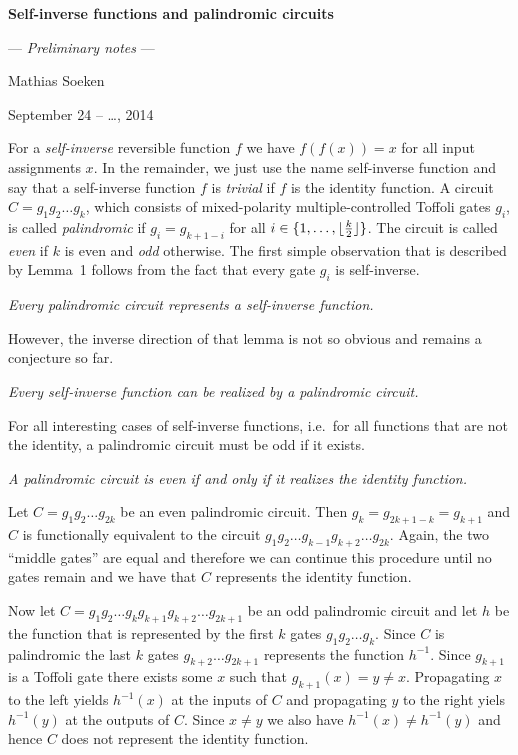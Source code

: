 \magnification\magstephalf
\parskip3pt
\baselineskip14pt

\def\slug{\hbox{\kern1.5pt\vrule width2.5pt height6pt depth1.5pt\kern1.5pt}}
\def\slugonright{\vrule width0pt\nobreak\hfill\slug}

\centerline{\bf Self-inverse functions and palindromic circuits}
\centerline{--- {\it Preliminary notes\/} ---}
\centerline{Mathias Soeken}
\centerline{September 24 -- \dots, 2014}

\bigskip
\bigskip

\enspace For a {\it self-inverse\/} reversible
function $f$ we have $f(f(x))=x$ for all input assignments $x$.  In the
remainder, we just use the name self-inverse function and say that a
self-inverse function $f$ is {\it trivial\/} if $f$ is the identity function.  A
circuit $C=g_1g_2\dots g_k$, which consists of mixed-polarity
multiple-controlled Toffoli gates $g_i$, is called {\it palindromic\/} if $ g_i
= g_{k+1-i}$ for all $i \in \{1,\dots,\lfloor{k\over 2}\rfloor\}$.  The circuit
is called {\it even\/} if $k$ is even and {\it odd\/} otherwise.  The first
simple observation that is described by Lemma~1 follows from the fact that every
gate $g_i$ is self-inverse.

 \sl Every palindromic circuit represents a self-inverse
function.\rm

\smallskip\noindent However, the inverse direction of that lemma is not so
obvious and remains a conjecture so far.

\smallskip {} \sl Every self-inverse function can be
realized by a palindromic circuit.\rm

\smallskip\noindent For all interesting cases of self-inverse functions,
i.e.~for all functions that are not the identity, a palindromic circuit must be
odd if it exists.

\smallskip {} \sl A palindromic circuit is even if and only
if it realizes the identity function. \rm

\smallskip{} Let $C=g_1g_2\dots g_{2k}$ be an even
palindromic circuit.  Then $g_{k}=g_{2k+1-k}=g_{k+1}$ and $C$ is functionally
equivalent to the circuit $g_1g_2\dots g_{k-1}g_{k+2} \dots g_{2k}$.  Again, the
two ``middle gates'' are equal and therefore we can continue this procedure
until no gates remain and we have that $C$ represents the identity function.

Now let $C=g_1g_2\dots g_kg_{k+1}g_{k+2}\dots g_{2k+1}$ be an odd palindromic
circuit and let $h$ be the function that is represented by the first $k$ gates
$g_1g_2\dots g_k$.  Since $C$ is palindromic the last $k$ gates $g_{k+2}\dots
g_{2k+1}$ represents the function $h^{-1}$.  Since $g_{k+1}$ is a Toffoli gate
there exists some $x$ such that $g_{k+1}(x)=y\neq x$.  Propagating $x$ to the
left yields $h^{-1}(x)$ at the inputs of $C$ and propagating $y$ to the right
yiels $h^{-1}(y)$ at the outputs of $C$.  Since $x\neq y$ we also have
$h^{-1}(x)\neq h^{-1}(y)$ and hence $C$ does not represent the identity
function.\qquad\slug

